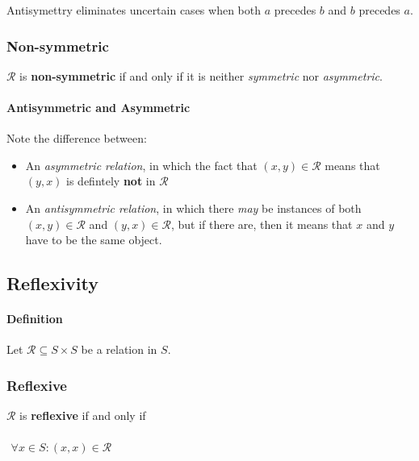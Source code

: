Antisymettry eliminates uncertain cases when both $a$ precedes $b$ and
$b$ precedes $a$.

\subsubsection{Non-symmetric}

$\mathcal{R}$ is \textbf{non-symmetric} if and only if it is neither
\textit{symmetric} nor \textit{asymmetric}.

\paragraph{Antisymmetric and Asymmetric}

Note the difference between:
\begin{itemize}
\item An \textit{asymmetric relation}, in which the fact that
  $(x, y) \in \mathcal{R}$ means that $(y, x)$ is defintely
  \textbf{not} in $\mathcal{R}$
\item An \textit{antisymmetric relation}, in which there \textit{may}
  be instances of both $(x, y) \in \mathcal{R}$ and
  $(y, x) \in \mathcal{R}$, but if there are, then it means that $x$
  and $y$ have to be the same object.
\end{itemize}


\subsection{Reflexivity}
\label{sec:reflexivity}

\paragraph{Definition}

Let $\mathcal{R} \subseteq S \times S$ be a relation in $S$.

\subsubsection{Reflexive}

$\mathcal{R}$ is \textbf{reflexive} if and only if

\begin{math}
  \begin{array}{c}
    \\
    \forall x \in S : (x, x) \in \mathcal{R} \\
    \\
  \end{array}
\end{math}



